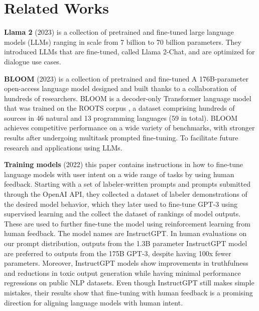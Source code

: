 \documentclass[fleqn,moreauthors,10pt]{ds_report}
\begin{document}



\section*{Related Works}

\noindent
\textbf{Llama 2} (2023) \cite{touvron2023llama} is a collection of pretrained and fine-tuned
large language models (LLMs) ranging in scale from 7 billion to 70 billion parameters.
They introduced LLMs that are fine-tuned, called Llama 2-Chat, and are optimized for dialogue use cases.

\noindent
\textbf{BLOOM} (2023) \cite{touvron2023llama} is a collection of pretrained and fine-tuned
A 176B-parameter open-access language model designed and built thanks to a collaboration of hundreds of researchers. BLOOM is a decoder-only Transformer language model that was trained on the ROOTS corpus \cite{laurençon2023bigscience}, a dataset comprising hundreds of
sources in 46 natural and 13 programming languages (59 in total). BLOOM achieves competitive performance on a wide variety of benchmarks, with stronger results after undergoing multitask prompted fine-tuning. To facilitate future research and applications using LLMs.

\noindent
\textbf{Training models} (2022) \cite{ouyang2022training} this paper contains instructions in how to fine-tune language models with user intent on a wide range of tasks by using human feedback.
Starting with a set of labeler-written prompts and prompts
submitted through the OpenAI API, they collected a dataset of labeler demonstrations
of the desired model behavior, which they later used to fine-tune GPT-3 using supervised
learning and the collect the dataset of rankings of model outputs. These are used to further fine-tune the model using reinforcement learning from human feedback. The model names are InstructGPT. In human evaluations on
our prompt distribution, outputs from the 1.3B parameter InstructGPT model are
preferred to outputs from the 175B GPT-3, despite having 100x fewer parameters.
Moreover, InstructGPT models show improvements in truthfulness and reductions
in toxic output generation while having minimal performance regressions on public
NLP datasets. Even though InstructGPT still makes simple mistakes, their results
show that fine-tuning with human feedback is a promising direction for aligning
language models with human intent.
\end{document}

